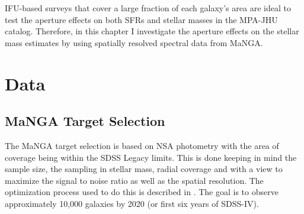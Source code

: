 
IFU-based surveys that cover a large fraction of each
galaxy's area are ideal to test the aperture 
effects on both SFRs and stellar masses in the MPA-JHU 
catalog. Therefore, in this chapter I investigate the aperture 
effects on the stellar mass estimates by using spatially 
resolved spectral data from MaNGA.\\


\section{Data}

\subsection{MaNGA Target Selection}
\label{mangadrp}


The MaNGA target selection is based on NSA photometry with the area of coverage being within the SDSS Legacy limits. This is done keeping in mind the sample size, the sampling in stellar mass, radial coverage and with a view to maximize the signal to noise ratio as well as the spatial resolution. The optimization process used to do this is described in \citet{2017AJ....154...86W}. The goal is to observe approximately 10,000 galaxies by 2020 (or first six years of SDSS-IV).\\

